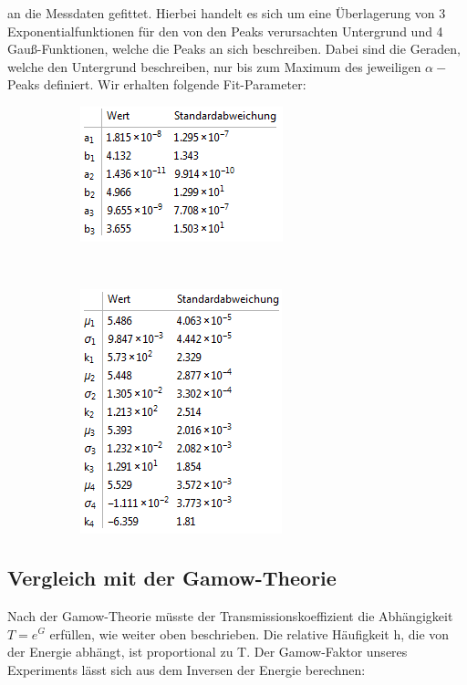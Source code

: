 \documentclass[bigchapter,colorback,accentcolor=tud4b,linedtoc,11pt]{tudreport}
\begin{document}
an die Messdaten gefittet. Hierbei handelt es sich um eine Überlagerung von 3
Exponentialfunktionen für den von den Peaks verursachten Untergrund und 4
Gauß-Funktionen, welche die Peaks an sich beschreiben. Dabei sind die Geraden, welche den Untergrund beschreiben, nur bis zum Maximum des jeweiligen $\alpha-$ Peaks definiert.
Wir erhalten folgende Fit-Parameter:
\begin{figure}[H]
    \centering
    \begin{subfigure}[H]{0.44\textwidth}
        \includegraphics[scale=1]{img/alpha-exp-fits-parameter.png}
    \end{subfigure}%
    \qquad
    ~%
    \begin{subfigure}[H]{0.44\textwidth}
        \includegraphics[scale=1]{img/alpha-gauss-fits-parameter.png}
    \end{subfigure}
\end{figure}


\subsection{Vergleich mit der Gamow-Theorie}
Nach der Gamow-Theorie müsste der Transmissionskoeffizient die Abhängigkeit $T = e^G$ erfüllen, wie weiter oben beschrieben. Die relative Häufigkeit h, die von der Energie abhängt, ist proportional zu T. Der Gamow-Faktor unseres Experiments lässt sich aus dem Inversen der Energie berechnen:
\end{document}
